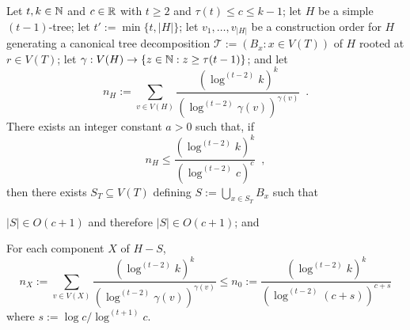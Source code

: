 \documentclass[kpfonts]{patmorin}
\theoremstyle{named}
\begin{document}
\begin{lem}\label{t-tree-no-slack-separator}
    Let $t,k\in\mathbb{N}$ and $c\in\mathbb{R}$ with $t\ge 2$ and $\tau(t)\le c\le k-1$; let $H$ be a simple $(t-1)$-tree; let $t':=\min\{t, |H|\}$; let $v_1,\ldots,v_{|H|}$ be a construction order for $H$ generating a canonical tree decomposition $\mathcal{T}:=(B_x:x\in V(T))$ of $H$ rooted at $r\in V(T)$; let $\gamma:V(H)\to\{z\in\mathbb{N}: z\ge \tau(t-1)\}$; and let
    \[
        n_H:=\sum_{v\in V(H)} \frac{\left(\log^{(t-2)} k\right)^k}{\left(\log^{(t-2)} \gamma(v)\right)^{\gamma(v)}} \enspace .
    \]
    There exists an integer constant $a>0$ such that,
    if
    \begin{equation}
         n_H \le \frac{(\log^{(t-2)} k)^k}{(\log^{(t-2)} c)^{c}} \enspace ,
     \label{total-weight-ii}
    \end{equation}
    then there exists $S_T\subseteq V(T)$ defining $S:=\bigcup_{x\in S_T} B_x$ such that
    \begin{compactenum}
        \item $|S|\in O(c+1)$ and therefore $|S|\in O(c+1)$; and
        \item For each component $X$ of $H-S$,
        \[
            n_X:=\sum_{v\in V(X)} \frac{\left(\log^{(t-2)} k\right)^k}{\left(\log^{(t-2)} \gamma(v)\right)^{\gamma(v)}}
            \le n_0 :=
            \frac{\left(\log^{(t-2)} k\right)^k}{\left(\log^{(t-2)} (c+s)\right)^{c+s}}
        \]
        where $s:=\log c/\log^{(t+1)} c$.
    \end{compactenum}
\end{lem}
\end{document}
